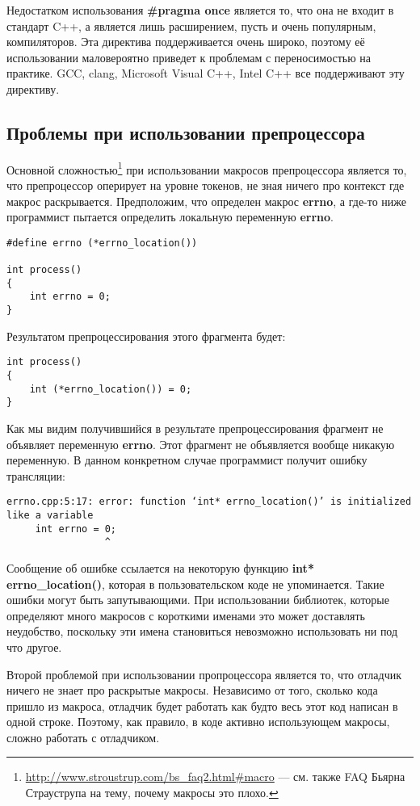 Недостатком использования {\bf \#pragma once} является то, что она не входит в стандарт C++, а является лишь расширением, пусть и очень популярным, компиляторов. Эта директива поддерживается очень широко, поэтому её использовании маловероятно приведет к проблемам с переносимостью на практике. GCC, clang, Microsoft Visual C++, Intel C++ все поддерживают эту директиву.

\subsection{Проблемы при использовании препроцессора}
Основной сложностью\footnote{\url{http://www.stroustrup.com/bs_faq2.html\#macro} --- см. также FAQ Бьярна Страуструпа на тему, почему макросы это плохо.} при использовании макросов препроцессора является то, что препроцессор оперирует на уровне токенов, не зная ничего про контекст где макрос раскрывается. Предположим, что определен макрос {\bf errno}, а где-то ниже программист пытается определить локальную переменную {\bf errno}.
\begin{verbatim}
#define errno (*errno_location())

int process()
{
    int errno = 0;
}
\end{verbatim}
Результатом препроцессирования этого фрагмента будет:
\begin{verbatim}
int process()
{
    int (*errno_location()) = 0;
}
\end{verbatim}
Как мы видим получившийся в результате препроцессирования фрагмент не объявляет переменную {\bf errno}. Этот фрагмент не объявляется вообще никакую переменную. В данном конкретном случае программист получит ошибку трансляции:
\begin{verbatim}
errno.cpp:5:17: error: function ‘int* errno_location()’ is initialized like a variable
     int errno = 0;
                 ^
\end{verbatim}
Сообщение об ошибке ссылается на некоторую функцию {\bf int* errno\_location()}, которая в пользовательском коде не упоминается. Такие ошибки могут быть запутывающими. При использовании библиотек, которые определяют много макросов с короткими именами это может доставлять неудобство, поскольку эти имена становиться невозможно использовать ни под что другое.

Второй проблемой при использовании пропроцессора является то, что отладчик ничего не знает про раскрытые макросы. Независимо от того, сколько кода пришло из макроса, отладчик будет работать как будто весь этот код написан в одной строке. Поэтому, как правило, в коде активно использующем макросы, сложно работать с отладчиком.

